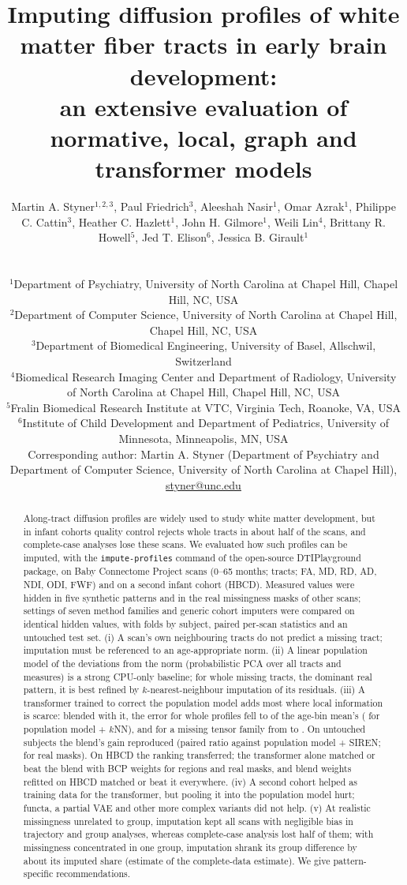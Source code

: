\documentclass[11pt]{article}
\title{Imputing diffusion profiles of white matter fiber tracts in early brain development:\\
\large an extensive evaluation of normative, local, graph and transformer models}
\author{\parbox{0.95\textwidth}{\centering Martin A. Styner$^{1,2,3}$, Paul Friedrich$^{3}$, Aleeshah Nasir$^{1}$, Omar Azrak$^{1}$, Philippe C. Cattin$^{3}$, Heather C. Hazlett$^{1}$, John H. Gilmore$^{1}$, Weili Lin$^{4}$, Brittany R. Howell$^{5}$, Jed T. Elison$^{6}$, Jessica B. Girault$^{1}$}\\[4pt]
\parbox{0.92\textwidth}{\raggedright\small
$^{1}$Department of Psychiatry, University of North Carolina at Chapel Hill, Chapel Hill, NC, USA\\
$^{2}$Department of Computer Science, University of North Carolina at Chapel Hill, Chapel Hill, NC, USA\\
$^{3}$Department of Biomedical Engineering, University of Basel, Allschwil, Switzerland\\
$^{4}$Biomedical Research Imaging Center and Department of Radiology, University of North Carolina at Chapel Hill, Chapel
Hill, NC, USA\\
$^{5}$Fralin Biomedical Research Institute at VTC, Virginia Tech, Roanoke, VA, USA\\
$^{6}$Institute of Child Development and Department of Pediatrics, University of Minnesota, Minneapolis, MN, USA\\[3pt]
Corresponding author: Martin A. Styner (Department of Psychiatry and Department of Computer Science, University of North
Carolina at Chapel Hill), \href{mailto:styner@unc.edu}{styner@unc.edu}}}
\date{}
\begin{document}
\maketitle

\begin{abstract}
\noindent Along-tract diffusion profiles are widely used to study white matter development, but in infant cohorts
quality control rejects whole tracts in about half of the scans, and complete-case analyses lose these scans. We
evaluated how such profiles can be imputed, with the \texttt{impute-profiles} command of the open-source DTIPlayground
package, on \bcpscans{} Baby Connectome Project scans (0--65 months; \bcptracts{} tracts; FA, MD, RD, AD, NDI, ODI, FWF)
and on a second infant cohort (HBCD). Measured values were hidden in five synthetic patterns and in the real missingness
masks of other scans; \nSettingsValidated{} settings of seven method families and generic cohort imputers were compared on
identical hidden values, with folds by subject, paired per-scan statistics and an untouched test set. (i) A scan's own
neighbouring tracts do not predict a missing tract; imputation must be referenced to an age-appropriate norm.
(ii) A linear population model of the deviations from the norm (probabilistic PCA over all tracts and measures) is a
strong CPU-only baseline; for whole missing tracts, the dominant real pattern, it is best refined by $k$-nearest-neighbour
imputation of its residuals. (iii) A transformer trained to correct the population model adds most where local
information is scarce: blended with it, the error for whole profiles fell to \rFinalWhole{} of the age-bin mean's
(\rPpcaKnnWhole{} for population model + $k$NN), and for a missing tensor family from \rPpcaWdti{} to \rFinalWdti.
On untouched subjects the blend's gain reproduced (paired ratio \eOneFinalVsDef{} against population model + SIREN;
\eOneFinalVsDefReal{} for real masks). On HBCD the ranking transferred; the transformer alone matched or beat the blend with BCP
weights for regions and real masks, and blend weights refitted on HBCD matched or beat it everywhere.
(iv) A second cohort helped as training data for the transformer, but pooling it into the population model hurt; functa,
a partial VAE and other more complex variants did not help. (v) At realistic missingness unrelated to group, imputation kept all
scans with negligible bias in trajectory and group analyses, whereas complete-case analysis lost half of them; with
missingness concentrated in one group, imputation shrank its group difference by about its imputed share (estimate \efDiffBlendRelfull{} of the complete-data estimate). We give
pattern-specific recommendations.
\end{abstract}
\end{document}
